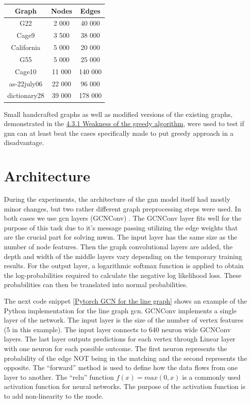 \begin{table}[h!]
\centering
{} 
\begin{tabular}{||c | c | c||} 
\hline
 Graph & Nodes & Edges \\ [0.5ex] 
 \hline\hline
 G22 & 2 000 & 40 000 \\
 \hline
 Cage9 & 3 500 & 38 000 \\
 \hline
 California & 5 000 & 20 000 \\
 \hline
 G55 & 5 000 & 25 000 \\
 \hline
 Cage10 & 11 000 & 140 000 \\
 \hline
 as-22july06 & 22 000 & 96 000 \\
 \hline
 dictionary28 & 39 000 & 178 000 \\ [1ex] 
 \hline
\end{tabular}
\label{large graphs for test}
\end{table}

Small handcrafted graphs as well as modified versions of the existing graphs, demonstrated in the \hyperref[sec:greedybadcase]{4.3.1 Weakness of the greedy algorithm}, were used to test if \gls{gnn} can at least beat the cases specifically made to put greedy approach in a disadvantage.

\section{Architecture}
\label{sec:architecture}
During the experiments, the architecture of the \gls{gnn} model itself had mostly minor changes, but two rather different graph preprocessing steps were used. In both cases we use \gls{gcn} layers (GCNConv) \cite{gcnpaper}. The GCNConv layer fits well for the purpose of this task due to it's message passing utilizing the edge weights that are the crucial part for solving \gls{mwm}. The input layer has the same size as the number of node features. Then the graph convolutional layers are added, the depth and width of the middle layers vary depending on the temporary training results. For the output layer, a logarithmic softmax function is applied to obtain the log-probabilities required to calculate the negative log likelihood loss. These probabilities can then be translated into normal probabilities. 

The next code snippet \ref{Pytorch GCN for the line graph} shows an example of the Python implementation for the line graph \gls{gcn}. GCNConv implements a single layer of the network. The input layer is the size of the number of vertex features (5 in this example). The input layer connects to 640 neuron wide GCNConv layers. The last layer outputs predictions for each vertex through Linear layer with one neuron for each possible outcome. The first neuron represents the probability of the edge NOT being in the matching and the second represents the opposite. The “forward” method is used to define how the data flows from one layer to another. The “relu” function $f(x) = max(0,x)$ is a commonly used activation function for neural networks. The purpose of the activation function is to add non-linearity to the mode.

